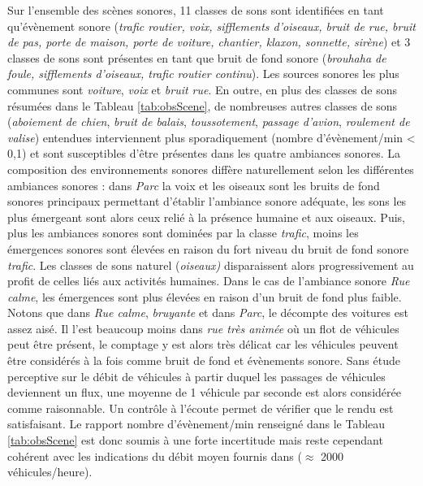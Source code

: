 Sur l'ensemble des scènes sonores, 11 classes de sons sont identifiées en tant qu'évènement sonore  (\textit{trafic routier, voix, sifflements d'oiseaux, bruit de rue, bruit de pas, porte de maison, porte de voiture, chantier, klaxon, sonnette, sirène}) et 3 classes de sons sont présentes en tant que bruit de fond sonore (\textit{brouhaha de foule, sifflements d'oiseaux, trafic routier continu}).
Les sources sonores les plus communes sont \textit{voiture}, \textit{voix} et \textit{bruit rue}. En outre, en plus des classes de sons résumées dans le Tableau \ref{tab:obsScene}, de nombreuses autres classes de sons (\textit{aboiement de chien}, \textit{bruit de balais}, \textit{toussotement}, \textit{passage d'avion}, \textit{roulement de valise}) entendues interviennent plus sporadiquement (nombre d'évènement/min < 0,1) et sont susceptibles d'être présentes dans les quatre ambiances sonores.
La composition des environnements sonores diffère naturellement selon les différentes ambiances sonores : dans \textit{Parc} la voix et les oiseaux sont les bruits de fond sonores principaux permettant d'établir l'ambiance sonore adéquate, les sons les plus émergeant sont alors ceux relié à la présence humaine et aux oiseaux. Puis, plus les ambiances sonores sont dominées par la classe \textit{trafic}, moins les émergences sonores sont élevées en raison du fort niveau du bruit de fond sonore \textit{trafic}. Les classes de sons \og naturel \fg{} (\textit{oiseaux)} disparaissent alors progressivement au profit de celles liés aux activités humaines. Dans le cas de l'ambiance sonore \textit{Rue calme}, les émergences sont plus élevées en raison d'un bruit de fond plus faible.
Notons que dans \textit{Rue calme}, \textit{bruyante} et dans \textit{Parc}, le décompte des voitures est assez aisé. Il l'est beaucoup moins dans \textit{rue très animée} où un flot de véhicules peut être présent, le comptage y est alors très délicat car les véhicules peuvent être considérés à la fois comme bruit de fond et évènements sonore.
Sans étude perceptive sur le débit de véhicules à partir duquel les passages de véhicules deviennent un flux, une moyenne de 1 véhicule par seconde est alors considérée comme raisonnable. Un contrôle à l'écoute permet de vérifier que le rendu est satisfaisant. Le rapport nombre d'évènement/min renseigné dans le Tableau \ref{tab:obsScene} est donc soumis à une forte incertitude mais reste cependant cohérent avec les indications du débit moyen fournis dans \cite{aumond2017modeling} ($\approx$ 2000 véhicules/heure). \\

